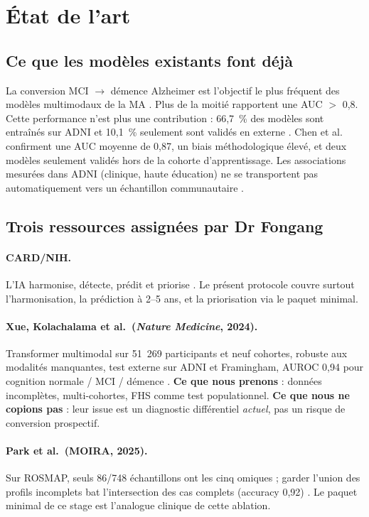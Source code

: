 \section{État de l'art}

\subsection{Ce que les modèles existants font déjà}

La conversion MCI $\rightarrow$ démence Alzheimer est l'objectif le plus fréquent des modèles multimodaux de la MA \cite{xia2025scoping}. Plus de la moitié rapportent une AUC $>$ 0,8. Cette performance n'est plus une contribution : 66,7~\% des modèles sont entraînés sur \ac{ADNI} et 10,1~\% seulement sont validés en externe \cite{xia2025scoping}. Chen et al.\ \cite{chen2024probast} confirment une AUC moyenne de 0,87, un biais méthodologique élevé, et deux modèles seulement validés hors de la cohorte d'apprentissage. Les associations mesurées dans ADNI (clinique, haute éducation) ne se transportent pas automatiquement vers un échantillon communautaire \cite{gianattasio2021aric}.

\subsection{Trois ressources assignées par Dr Fongang}

\paragraph{CARD/NIH.} L'IA harmonise, détecte, prédit et priorise \cite{card2024ai}. Le présent protocole couvre surtout l'harmonisation, la prédiction à 2--5 ans, et la priorisation via le paquet minimal.

\paragraph{Xue, Kolachalama et al.\ (\emph{Nature Medicine}, 2024).} Transformer multimodal sur 51~269 participants et neuf cohortes, robuste aux modalités manquantes, test externe sur ADNI et Framingham, AUROC 0,94 pour cognition normale / MCI / démence \cite{xue2024natmed}. \textbf{Ce que nous prenons} : données incomplètes, multi-cohortes, FHS comme test populationnel. \textbf{Ce que nous ne copions pas} : leur issue est un diagnostic différentiel \emph{actuel}, pas un risque de conversion prospectif.

\paragraph{Park et al.\ (MOIRA, 2025).} Sur ROSMAP, seuls 86/748 échantillons ont les cinq omiques ; garder l'union des profils incomplets bat l'intersection des cas complets (accuracy 0,92) \cite{park2025moira}. Le paquet minimal de ce stage est l'analogue clinique de cette ablation.

